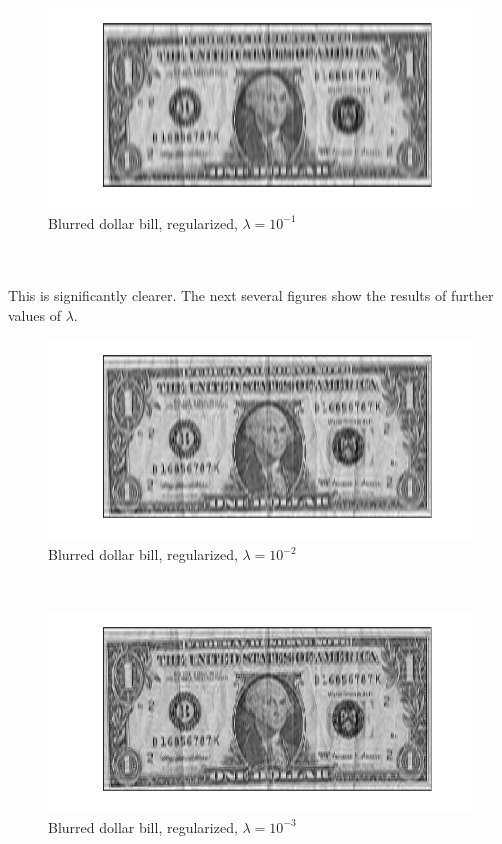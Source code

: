 \documentclass[12pt]{article}
\begin{document}
\begin{flushleft}
\begin{figure}[H]
	\centering
	\captionsetup{justification=centering}
	\includegraphics[scale=0.55]{images/lambda01.png}
	\caption{Blurred dollar bill, regularized, $\lambda = 10^{-1}$}
\end{figure}
\ \\
\ \\
This is significantly clearer. The next several figures show the results of further values of $\lambda$.

\begin{figure}[H]
	\centering
	\captionsetup{justification=centering}
	\includegraphics[scale=0.55]{images/lambda001.png}
	\caption{Blurred dollar bill, regularized, $\lambda = 10^{-2}$}
\end{figure}
\ \\

\begin{figure}[H]
	\centering
	\captionsetup{justification=centering}
	\includegraphics[scale=0.55]{images/lambda0001.png}
	\caption{Blurred dollar bill, regularized, $\lambda = 10^{-3}$}
\end{figure}
\ \\


\end{flushleft}
\end{document}
